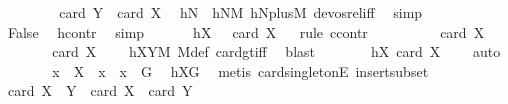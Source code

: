 \begin{isabellebody}
\ \ \ \ \isamarkupfalse%
\ \isamarkupfalse%
\ {\isachardoublequoteopen}{\isasymnot}\ card\ Y\ {\isacharless}{\kern0pt}\ card\ X{\isachardoublequoteclose}\ \isamarkupfalse%
\ hN\ \ hNM\ hNplusM\ devos{\isacharunderscore}{\kern0pt}rel{\isacharunderscore}{\kern0pt}iff\ \isamarkupfalse%
\ simp\isanewline
\ \ \ \ \isamarkupfalse%
\ \isamarkupfalse%
\ False\ \isamarkupfalse%
\ hcontr\ \isamarkupfalse%
\ simp\isanewline
\ \ \isamarkupfalse%
\isanewline
\ \ \isamarkupfalse%
\ hX{}{\isacharcolon}{\kern0pt}\ {\isachardoublequoteopen}{}\ {\isasymle}\ card\ X{\isachardoublequoteclose}\isanewline
\ \ \isamarkupfalse%
{\isacharparenleft}{\kern0pt}rule\ ccontr{\isacharparenright}{\kern0pt}\isanewline
\ \ \ \ \isamarkupfalse%
\ {\isachardoublequoteopen}\ {\isasymnot}\ {}\ {\isasymle}\ card\ X{\isachardoublequoteclose}\isanewline
\ \ \ \ \isamarkupfalse%
\ \isamarkupfalse%
\ {\isachardoublequoteopen}card\ X\ {\isachargreater}{\kern0pt}\ {}{\isachardoublequoteclose}\ \isamarkupfalse%
\ hXYM\ M{\isacharunderscore}{\kern0pt}def\ card{\isacharunderscore}{\kern0pt}gt{\isacharunderscore}{\kern0pt}{}{\isacharunderscore}{\kern0pt}iff\ \isamarkupfalse%
\ blast\isanewline
\ \ \ \ \isamarkupfalse%
\ \isamarkupfalse%
\ hX{}{\isacharcolon}{\kern0pt}\ {\isachardoublequoteopen}card\ X\ {\isacharequal}{\kern0pt}\ {}{\isachardoublequoteclose}\ \isamarkupfalse%
\ auto\isanewline
\ \ \ \ \isamarkupfalse%
\ \isamarkupfalse%
\ x\ \ {\isachardoublequoteopen}X\ {\isacharequal}{\kern0pt}\ {\isacharbraceleft}{\kern0pt}x{\isacharbraceright}{\kern0pt}{\isachardoublequoteclose}\ \ {\isachardoublequoteopen}x\ {\isasymin}\ G{\isachardoublequoteclose}\ \isamarkupfalse%
\ hXG\ \isamarkupfalse%
\ {\isacharparenleft}{\kern0pt}metis\ card{\isacharunderscore}{\kern0pt}{}{\isacharunderscore}{\kern0pt}singletonE\ insert{\isacharunderscore}{\kern0pt}subset{\isacharparenright}{\kern0pt}\isanewline
\ \ \ \ \isamarkupfalse%
\ \isamarkupfalse%
\ {\isachardoublequoteopen}card\ {\isacharparenleft}{\kern0pt}X\ {\isasymcdots}\ Y{\isacharparenright}{\kern0pt}\ {\isacharequal}{\kern0pt}\ card\ X\ {\isacharplus}{\kern0pt}\ card\ Y\ {\isacharminus}{\kern0pt}\ {}{\isachardoublequoteclose}\ \isamarkupfalse%

\end{isabellebody}
